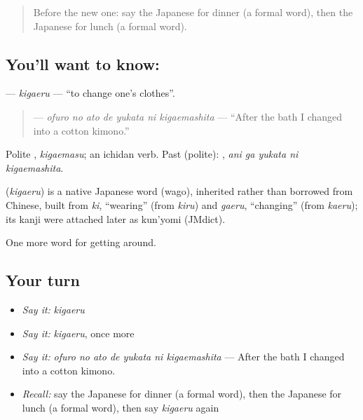 \label{lesson:JA-C401-kigaeru}



\begin{quote}
Before the new one: say the Japanese for dinner (a formal word), then the Japanese for lunch (a formal word).
\end{quote}

\subsection*{You'll want to know: }
\textbf{} — \emph{kigaeru} — \textquotedblleft{}to change one's clothes\textquotedblright{}.

\begin{quote}
\textbf{   } — \emph{ofuro no ato de yukata ni kigaemashita} — \textquotedblleft{}After the bath I changed into a cotton kimono.\textquotedblright{}
\end{quote}

Polite \textbf{}, \emph{kigaemasu}; an ichidan verb. Past (polite): \textbf{  }, \emph{ani ga yukata ni kigaemashita}.

\begin{cousinweb}
\textbf{} (\emph{kigaeru}) is a native Japanese word (wago), inherited rather than borrowed from Chinese, built from \emph{ki}, \textquotedblleft{}wearing\textquotedblright{} (from \emph{kiru}) and \emph{gaeru}, \textquotedblleft{}changing\textquotedblright{} (from \emph{kaeru}); its kanji were attached later as kun'yomi (JMdict).
\end{cousinweb}

\begin{grammarlens}[title={What you've built}]
One more word for getting around.
\end{grammarlens}

\subsection*{Your turn}
\begin{itemize}
\raggedright
  \item \emph{Say it:} \emph{kigaeru}
  \item \emph{Say it:} \emph{kigaeru}, once more
  \item \emph{Say it:} \emph{ofuro no ato de yukata ni kigaemashita} — After the bath I changed into a cotton kimono.
  \item \emph{Recall:} say the Japanese for dinner (a formal word), then the Japanese for lunch (a formal word), then say \emph{kigaeru} again
\end{itemize}

